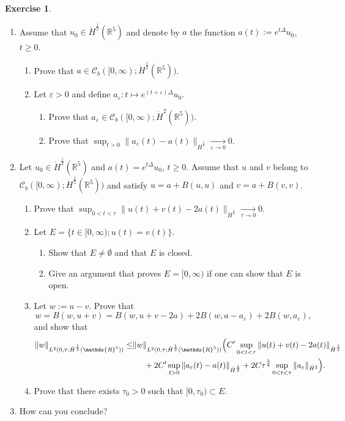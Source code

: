 \documentclass[a4paper, 12pt]{article}
\theoremstyle{plain}
\theoremstyle{definition}
\newtheorem{exercise}{Exercise}
\theoremstyle{remark}
\numberwithin{equation}{section}
\begin{document}
\begin{exercise}
\begin{enumerate}
\item 
Assume that $u_0\in \dot H^{\frac{1}{2}}({\mathds{R}}^5)$ and denote by $a$ the function $a(t):=e^{t\Delta}u_0$, $t\ge 0$.
%
\begin{enumerate}
\item 
Prove that $a\in {\mathscr{C}}_b([0,\infty);\dot H^{\frac{1}{2}}({\mathds{R}}^5))$.
\item 
Let $\varepsilon>0$ and define $a_\varepsilon:t\mapsto e^{(t+\varepsilon)\Delta}u_0$.
%
\begin{enumerate}
\item 
Prove that $a_\varepsilon\in {\mathscr{C}}_b([0,\infty);\dot H^{2}({\mathds{R}}^5))$.
\item 
Prove that $\sup_{t>0}\|a_\varepsilon(t)-a(t)\|_{\dot H^{\frac{1}{2}}}\xrightarrow[\varepsilon\to 0]{}0$.
\end{enumerate}
\end{enumerate}
\item 
Let $u_0\in \dot H^{\frac{1}{2}}({\mathds{R}}^5)$ and $a(t)=e^{t\Delta}u_0$, $t\ge 0$.
Assume that $u$ and $v$ belong to ${\mathscr{C}}_b([0,\infty);\dot H^{\frac{1}{2}}({\mathds{R}}^5))$ and satisfy
$u=a+B(u,u)$ and $v=a+B(v,v)$.
%
\begin{enumerate}
\item 
Prove that $\sup_{0<t<\tau}\|u(t)+v(t)-2a(t)\|_{\dot H^{\frac{1}{2}}}\xrightarrow[\tau\to 0]{}0$.
\item
Let $E=\bigl\{t\in [0,\infty); u(t)=v(t)\bigr\}$.
%
\begin{enumerate}
\item 
Show that $E\neq \emptyset$ and that $E$ is closed.
\item 
Give an argument that proves $E=[0,\infty)$ if one can show that $E$ is open.
\end{enumerate}
%
\item 
Let $w:=u-v$. Prove that 
\[
w=B(w,u+v)=B(w,u+v-2a)+2B(w,a-a_\varepsilon)+2B(w,a_\varepsilon),
\]
and show that
%
\begin{align*}
\|w\|_{L^2(0,\tau;\dot H^{\frac{1}{2}}({\mathds{R}}^5))}\le &\|w\|_{L^2(0,\tau;\dot H^{\frac{1}{2}}({\mathds{R}}^5))}
\Bigl(C'\sup_{0<t<\tau}\|u(t)+v(t)-2a(t)\|_{\dot H^{\frac{1}{2}}}\\
&\hspace*{.5cm}+2C'\sup_{t>0}\|a_\varepsilon(t)-a(t)\|_{\dot H^{\frac{1}{2}}}
+2C\tau^{\frac{3}{4}}\sup_{0<t<\tau}\|a_\varepsilon\|_{\dot H^2}\Bigr).
\end{align*}
%
\item 
Prove that there exists $\tau_0>0$ such that $[0,\tau_0)\subset E$.
\end{enumerate}
\item 
How can you conclude?
\end{enumerate}
\end{exercise}
 
\end{document}

